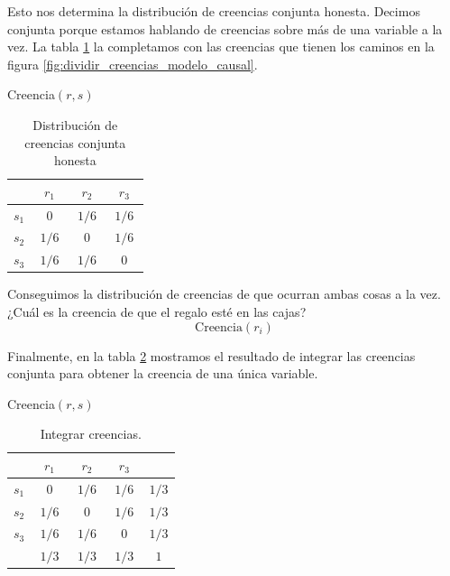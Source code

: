 \documentclass[a4paper,10pt]{book}
\begin{document}
Esto nos determina la distribución de creencias conjunta honesta.
Decimos conjunta porque estamos hablando de creencias sobre más de una variable a la vez.
La tabla \ref{tab:creencia_conjunta_honesta} la completamos con las creencias que tienen los caminos en la figura \ref{fig:dividir_creencias_modelo_causal}.
\begin{table}[H]
  \centering
  Creencia$(r,s)$ \\ \vspace{0.3cm}
 \begin{tabular}{c|c|c|c|} \setlength\tabcolsep{0.4cm} 
        & \, $r_1$ \, &  \, $r_2$ \, & \, $r_3$ \, \\ \hline 
  $s_1$  & $0$ & $1/6$ & $1/6$  \\ \hline
  $s_2$  & $1/6$ & $0$ & $1/6$   \\ \hline
       $s_3$ & $1/6$ & $1/6$ & $0$   \\ \hline 
\end{tabular}
\caption{Distribución de creencias conjunta honesta}
\label{tab:creencia_conjunta_honesta}
\end{table}

Conseguimos la distribución de creencias de que ocurran ambas cosas a la vez.
¿Cuál es la creencia de que el regalo esté en las cajas?
\begin{equation}
 \text{Creencia}(r_i)
\end{equation}


Finalmente, en la tabla \ref{tab:creencia_marginal_honesta} mostramos el resultado de integrar las creencias conjunta para obtener la creencia de una única variable.
\begin{table}[H]
  \centering
    Creencia$(r,s)$ \\ \vspace{0.3cm}
    \begin{tabular}{c|c|c|c||c} \setlength\tabcolsep{0.4cm} 
            & \, $r_1$ \, &  \, $r_2$ \, & \, $r_3$ \, & \phantom{\bm{$1/3$}} \\ \hline 
    $s_1$ & $0$ & $1/6$ & $1/6$ & $1/3$ \\ \hline
    $s_2$ & $1/6$ & $0$ & $1/6$ & $1/3$ \\ \hline
    $s_3$ & $1/6$ & $1/6$ & $0$ & $1/3$ \\ \hline \hline
            & $1/3$ & $1/3$ & $1/3$ & $1$ \\ 
    \end{tabular}
  \caption{Integrar creencias.}
  \label{tab:creencia_marginal_honesta}
\end{table}
\end{document}
